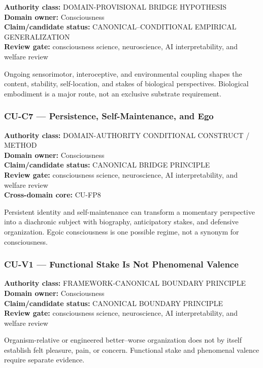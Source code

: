 \documentclass[
  11pt,
]{article}
\begin{document}
\textbf{Authority class:} DOMAIN-PROVISIONAL BRIDGE HYPOTHESIS\\
\textbf{Domain owner:} Consciousness\\
\textbf{Claim/candidate status:} CANONICAL--CONDITIONAL EMPIRICAL
GENERALIZATION\\
\textbf{Review gate:} consciousness science, neuroscience, AI
interpretability, and welfare review

Ongoing sensorimotor, interoceptive, and environmental coupling shapes
the content, stability, self-location, and stakes of biological
perspectives. Biological embodiment is a major route, not an exclusive
substrate requirement.

\subsubsection{CU-C7 --- Persistence, Self-Maintenance, and
Ego}\label{cu-c7-persistence-self-maintenance-and-ego}

\textbf{Authority class:} DOMAIN-AUTHORITY CONDITIONAL CONSTRUCT /
METHOD\\
\textbf{Domain owner:} Consciousness\\
\textbf{Claim/candidate status:} CANONICAL BRIDGE PRINCIPLE\\
\textbf{Review gate:} consciousness science, neuroscience, AI
interpretability, and welfare review\\
\textbf{Cross-domain core:} CU-FP8

Persistent identity and self-maintenance can transform a momentary
perspective into a diachronic subject with biography, anticipatory
stakes, and defensive organization. Egoic consciousness is one possible
regime, not a synonym for consciousness.

\subsubsection{CU-V1 --- Functional Stake Is Not Phenomenal
Valence}\label{cu-v1-functional-stake-is-not-phenomenal-valence}

\textbf{Authority class:} FRAMEWORK-CANONICAL BOUNDARY PRINCIPLE\\
\textbf{Domain owner:} Consciousness\\
\textbf{Claim/candidate status:} CANONICAL BOUNDARY PRINCIPLE\\
\textbf{Review gate:} consciousness science, neuroscience, AI
interpretability, and welfare review

Organism-relative or engineered better--worse organization does not by
itself establish felt pleasure, pain, or concern. Functional stake and
phenomenal valence require separate evidence.
\end{document}
